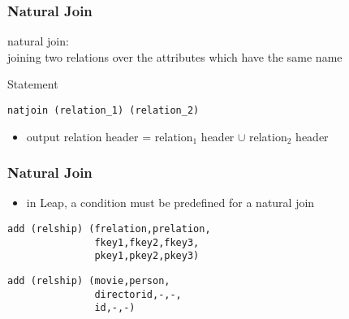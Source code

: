 \documentclass[dvipsnames]{beamer}
\theoremstyle{plain}
\begin{document}
\begin{frame}[fragile]
  \frametitle{Natural Join}

  \begin{definition}
    \alert{natural join}:\\
      joining two relations over the attributes which have the same name
  \end{definition}

  \pause
  \begin{block}{Statement}
    \begin{lstlisting}
natjoin (relation_1) (relation_2)
    \end{lstlisting}
  \end{block}

  \pause
  \begin{itemize}
    \item output relation header = relation$_1$ header $\cup$ relation$_2$
      header
  \end{itemize}
\end{frame}

\begin{frame}[fragile]
  \frametitle{Natural Join}

  \begin{itemize}
    \item in Leap, a condition must be predefined for a natural join
  \end{itemize}

  \begin{lstlisting}
add (relship) (frelation,prelation,
               fkey1,fkey2,fkey3,
               pkey1,pkey2,pkey3)
  \end{lstlisting}

  \pause
  \begin{example}
    \begin{lstlisting}
add (relship) (movie,person,
               directorid,-,-,
               id,-,-)
    \end{lstlisting}
  \end{example}
\end{frame}
\end{document}
